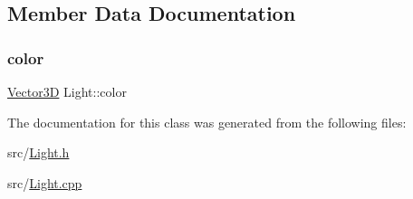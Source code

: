 \subsection{Member Data Documentation}
\mbox{\label{classLight_aea5f05e83e7f64b0a9360a52bcef2250}} 
\subsubsection{\texorpdfstring{color}{color}}
{\footnotesize\ttfamily \mbox{\hyperlink{classVector3D}{Vector3D}} Light\+::color\hspace{0.3cm}{\ttfamily [private]}}



The documentation for this class was generated from the following files\+:\begin{DoxyCompactItemize}
\item 
src/\mbox{\hyperlink{Light_8h}{Light.\+h}}\item 
src/\mbox{\hyperlink{Light_8cpp}{Light.\+cpp}}\end{DoxyCompactItemize}
